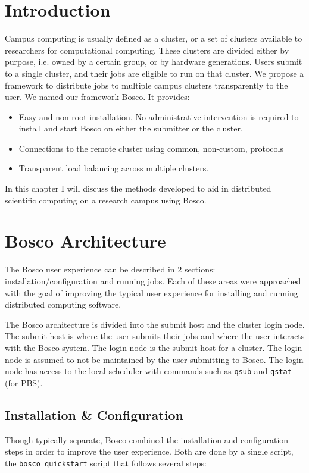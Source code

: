 \label{chapter:campusjobs} 
\section{Introduction}

Campus computing is usually defined as a cluster, or a set of clusters available to researchers for computational computing.  These clusters are divided either by purpose, i.e. owned by a certain group, or by hardware generations.  Users submit to a single cluster, and their jobs are eligible to run on that cluster.  We propose a framework to distribute jobs to multiple campus clusters transparently to the user.  We named our framework Bosco.  It provides:
\begin{itemize}
\item Easy and non-root installation.  No administrative intervention is required to install and start Bosco on either the submitter or the cluster.
\item Connections to the remote cluster using common, non-custom, protocols
\item Transparent load balancing across multiple clusters.
\end{itemize}

In this chapter I will discuss the methods developed to aid in distributed scientific computing on a research campus using Bosco.  

\section{Bosco Architecture}
\label{sec:boscoarch}

% 

The Bosco user experience can be described in 2 sections: installation/configuration and running jobs.  Each of these areas were approached with the goal of improving the typical user experience for installing and running distributed computing software.

The Bosco architecture is divided into the submit host and the cluster login node.  The submit host is where the user submits their jobs and where the user interacts with the Bosco system.  The login node is the submit host for a cluster.  The login node is assumed to not be maintained by the user submitting to Bosco.  The login node has access to the local scheduler with commands such as \texttt{qsub} and \texttt{qstat} (for PBS).  

\subsection{Installation \& Configuration}
Though typically separate, Bosco combined the installation and configuration steps in order to improve the user experience.  Both are done by a single script, the \texttt{bosco\_quickstart} script that follows several steps:


